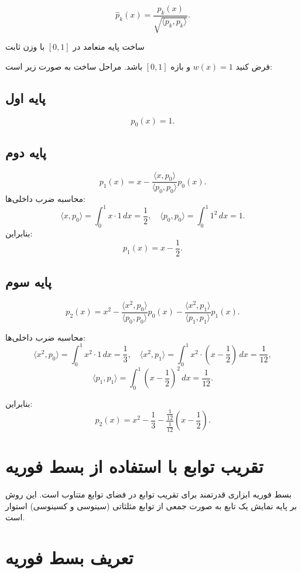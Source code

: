 \[
\hat{p}_k(x) = \frac{p_k(x)}{\sqrt{\langle p_k, p_k \rangle}}.
\]
\begin{example}
	ساخت پایه متعامد در \([0, 1]\) با وزن ثابت
\end{example}
\begin{solution}
	
	فرض کنید \(w(x) = 1\) و بازه \([0, 1]\) باشد. مراحل ساخت به صورت زیر است:
	
	\subsection{پایه اول}
	\[
	p_0(x) = 1.
	\]
	\subsection{پایه دوم}
	\[
	p_1(x) = x - \frac{\langle x, p_0 \rangle}{\langle p_0, p_0 \rangle} p_0(x).
	\]
	محاسبه ضرب داخلی‌ها:
	\[
	\langle x, p_0 \rangle = \int_0^1 x \cdot 1 \, dx = \frac{1}{2}, \quad \langle p_0, p_0 \rangle = \int_0^1 1^2 \, dx = 1.
	\]
	بنابراین:
	\[
	p_1(x) = x - \frac{1}{2}.
	\]
	\subsection{پایه سوم}
	
	\[
	p_2(x) = x^2 - \frac{\langle x^2, p_0 \rangle}{\langle p_0, p_0 \rangle} p_0(x) - \frac{\langle x^2, p_1 \rangle}{\langle p_1, p_1 \rangle} p_1(x).
	\]
	
	محاسبه ضرب داخلی‌ها:
	\[
	\langle x^2, p_0 \rangle = \int_0^1 x^2 \cdot 1 \, dx = \frac{1}{3}, \quad \langle x^2, p_1 \rangle = \int_0^1 x^2 \cdot \left(x - \frac{1}{2}\right) \, dx = \frac{1}{12},
	\]
	\[
	\langle p_1, p_1 \rangle = \int_0^1 \left(x - \frac{1}{2}\right)^2 \, dx = \frac{1}{12}.
	\]
	
	بنابراین:
	\[
	p_2(x) = x^2 - \frac{1}{3} - \frac{\frac{1}{12}}{\frac{1}{12}} \left(x - \frac{1}{2}\right).
	\]
\end{solution}

\section{تقریب توابع با استفاده از بسط فوریه}
بسط فوریه ابزاری قدرتمند برای تقریب توابع در فضای توابع متناوب است. این روش بر پایه نمایش یک تابع به صورت جمعی از توابع مثلثاتی (سینوسی و کسینوسی) استوار است. 

\section{تعریف بسط فوریه}

